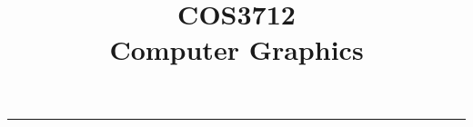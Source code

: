 \documentclass[11pt, a4paper]{book}
\title{COS3712\\Computer Graphics}
\author{ }
\begin{document}
  \frontmatter
  \begin{titlepage}
    \maketitle
  \end{titlepage}
  \clearpage\begingroup\pagestyle{empty}\cleardoublepage\endgroup
  \tableofcontents
  \noindent\rule{\textwidth}{0.4pt}
  \mainmatter
\end{document}
